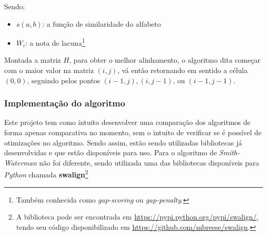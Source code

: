 Sendo:
\begin{itemize}
	\item $s(a,b)$: a função de similaridade do alfabeto
	\item $W_i$: a nota de lacuna\footnote{Também conhecida como \textit{gap-scoring} ou \textit{gap-penalty}.}
\end{itemize}

Montada a matriz $H$, para obter o melhor alinhamento, o algoritmo dita começar com o maior valor na matriz $(i,j)$, vá então retornando em sentido a célula $(0,0)$, seguindo pelos pontos $(i - 1,j), (i, j - 1)$, ou $(i - 1, j - 1)$.

\subsubsection{Implementação do algoritmo} %
\label{sub:implementa_o_do_algoritmo}

Este projeto tem como intuito desenvolver uma comparação dos algoritmos de forma apenas comparativa no momento, sem o intuito de verificar se é possível de otimizações no algoritmo. Sendo assim, estão sendo utilizadas bibliotecas já desenvolvidas e que estão  disponíveis para uso. Para o algoritmo de \textit{Smith-Waterman} não foi diferente, sendo utilizada uma das bibliotecas disponíveis para \textit{Python} chamada \textbf{swalign}\footnote{A biblioteca pode ser encontrada em \url{https://pypi.python.org/pypi/swalign/}, tendo seu código disponibilizado em \url{https://github.com/mbreese/swalign}.}

